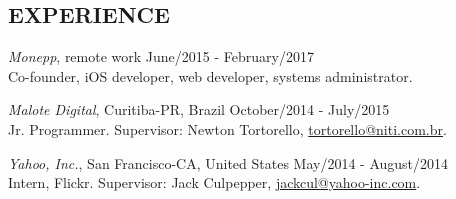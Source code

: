 \documentclass[margin]{res}
\begin{document}
\begin{resume}
 		\section{EXPERIENCE}
 			{\sl Monepp}, remote work \hfill June/2015 - February/2017 \\
			Co-founder, iOS developer, web developer, systems administrator.
 		
			{\sl Malote Digital}, Curitiba-PR, Brazil \hfill October/2014 - July/2015 \\
			Jr. Programmer.
			Supervisor: Newton Tortorello, \href{mailto:tortorello@niti.com.br}{tortorello@niti.com.br}.

			{\sl Yahoo, Inc.}, San Francisco-CA, United States \hfill May/2014 - August/2014 \\
			Intern, Flickr.
			Supervisor: Jack Culpepper, \href{mailto:jackcul@yahoo-inc.com}{jackcul@yahoo-inc.com}.

			

\end{resume}
\end{document}
